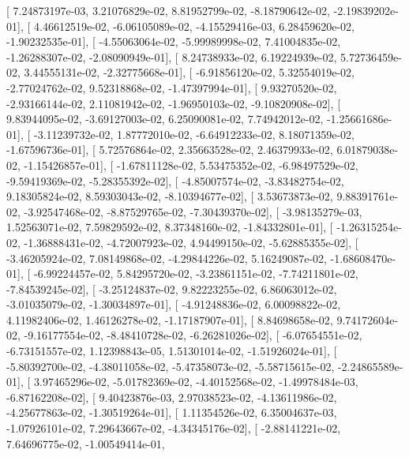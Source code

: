 \documentclass{article}
\begin{document}
       [  7.24873197e-03,   3.21076829e-02,   8.81952799e-02,
         -8.18790642e-02,  -2.19839202e-01],
       [  4.46612519e-02,  -6.06105089e-02,  -4.15529416e-03,
          6.28459620e-02,  -1.90232535e-01],
       [ -4.55063064e-02,  -5.99989998e-02,   7.41004835e-02,
         -1.26288307e-02,  -2.08090949e-01],
       [  8.24738933e-02,   6.19224939e-02,   5.72736459e-02,
          3.44555131e-02,  -2.32775668e-01],
       [ -6.91856120e-02,   5.32554019e-02,  -2.77024762e-02,
          9.52318868e-02,  -1.47397994e-01],
       [  9.93270520e-02,  -2.93166144e-02,   2.11081942e-02,
         -1.96950103e-02,  -9.10820908e-02],
       [  9.83944095e-02,  -3.69127003e-02,   6.25090081e-02,
          7.74942012e-02,  -1.25661686e-01],
       [ -3.11239732e-02,   1.87772010e-02,  -6.64912233e-02,
          8.18071359e-02,  -1.67596736e-01],
       [  5.72576864e-02,   2.35663528e-02,   2.46379933e-02,
          6.01879038e-02,  -1.15426857e-01],
       [ -1.67811128e-02,   5.53475352e-02,  -6.98497529e-02,
         -9.59419369e-02,  -5.28355392e-02],
       [ -4.85007574e-02,  -3.83482754e-02,   9.18305824e-02,
          8.59303043e-02,  -8.10394677e-02],
       [  3.53673873e-02,   9.88391761e-02,  -3.92547468e-02,
         -8.87529765e-02,  -7.30439370e-02],
       [ -3.98135279e-03,   1.52563071e-02,   7.59829592e-02,
          8.37348160e-02,  -1.84332801e-01],
       [ -1.26315254e-02,  -1.36888431e-02,  -4.72007923e-02,
          4.94499150e-02,  -5.62885355e-02],
       [ -3.46205924e-02,   7.08149868e-02,  -4.29844226e-02,
          5.16249087e-02,  -1.68608470e-01],
       [ -6.99224457e-02,   5.84295720e-02,  -3.23861151e-02,
         -7.74211801e-02,  -7.84539245e-02],
       [ -3.25124837e-02,   9.82223255e-02,   6.86063012e-02,
         -3.01035079e-02,  -1.30034897e-01],
       [ -4.91248836e-02,   6.00098822e-02,   4.11982406e-02,
          1.46126278e-02,  -1.17187907e-01],
       [  8.84698658e-02,   9.74172604e-02,  -9.16177554e-02,
         -8.48410728e-02,  -6.26281026e-02],
       [ -6.07654551e-02,  -6.73151557e-02,   1.12398843e-05,
          1.51301014e-02,  -1.51926024e-01],
       [ -5.80392700e-02,  -4.38011058e-02,  -5.47358073e-02,
         -5.58715615e-02,  -2.24865589e-01],
       [  3.97465296e-02,  -5.01782369e-02,  -4.40152568e-02,
         -1.49978484e-03,  -6.87162208e-02],
       [  9.40423876e-03,   2.97038523e-02,  -4.13611986e-02,
         -4.25677863e-02,  -1.30519264e-01],
       [  1.11354526e-02,   6.35004637e-03,  -1.07926101e-02,
          7.29643667e-02,  -4.34345176e-02],
       [ -2.88141221e-02,   7.64696775e-02,  -1.00549414e-01,
\end{document}
